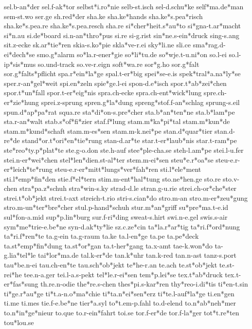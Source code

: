 sel.b-an*der
sel.f-ak*tor
selbst*i.ro*nie
selb-st.isch
sel-d.schu*ke
self*ma.de*man
sem-st.wo
ser.ge
sh.red*der
sha.ke
sha.ke*hands
sha.ke*s.pea*risch
sha.ke*s.pea.re
sha.ke*s.pea.resch
sha.re
si*cher*heit.s*au*to
si*gna-t.ar*macht
si*n.au
si.de*board
si.n-an*thro*pus
si.re
si-g.rist
sin*ne.s-ein*druck
sing-s.ang
sit.z-ecke
sk.ar*tie*ren
skia-s.ko*pie
skla*ve-r.ei
sky*li.ne
sli.ce
sma*rag.d-ei*dech*se
smo.g*alarm
so*la.r-ener*gie
so*li*tu.de
so*wje.t-u.ni*on
so.l-ei
so.l-ip*sis*mus
so.und-track
so.ve-r.eign
soft*wa.re
sor*g.ho
sor.g*falt
sor.g*falts*pflicht
spa.r*ein*la*ge
spal.t-er*big
spei*se-e.is
spek*tral*a.na*ly*se
sper.r-an*gel*weit
spi.en*zeln
spie*ge.l-ei
spon-d.e*isch
spor.t*ab*zei*chen
spor.t*un*fall
spor.t-er*eig*nis
spra.ch-ecke
spra.ch-ent*wick*lung
spre.ch-er*zie*hung
sprei.z-sprung
spren.g*la*dung
spreng*stof.f-an*schlag
sprung-s.eil
spun.d*ap*pa*rat
squa.re
sta*di*on-s.pre*cher
sta.b*an*ten*ne
sta.b*lam*pe
sta.r-an*walt
stab.s*of*fi*zier
staf.f*lung
stam.m*ka*pi*tal
stam.m*kun*de
stam.m*kund*schaft
stam.m-es*sen
stam.m-k.nei*pe
stan.d*quar*tier
stan.d-re*de
stand*or.t*ori*en*tie*rung
stan-d.ar*te
star.t-er*laub*nis
star.t-ram*pe
ste*reo*ty.p*plat*te
ste.g-o.don
ste.h-auf
stee*ple-cha.se
steh-l.am*pe
stei.l-u.fer
stei.n-er*wei*chen
stel*len*dien.st-al*ter
stem.m-ei*sen
steu*e.r*oa*se
steu-e.r-er*leich*te*rung
steu-e.r-er*mitt*lungs*ver*fah*ren
sti.l*ele*ment
sti.l*emp*fin*den
stie.f*el*tern
stim.m-ent*hal*tung
sto.ne*hen.ge
sto.re
sto.v-chen
stra*pa.z*schuh
stra*win-s.ky
strad-d.le
stran.g-u.rie
strei.ch-or*che*ster
strei.t*ob*jekt
strei.t-axt
streich-t.rio
stri-s.cian*do
stro.m-an
stro.m-er*zeu*gung
stro.m-un*ter*bre*cher
stul.p-hand*schuh
stur.m*an*griff
su*pre*ma.t-e.id
sul*fon-a.mid
sup*p.lin*burg
sur.f-ri*ding
sweat-s.hirt
swi.n-e.gel
swis.s-air
sym*me*trie-e.be*ne
syn-d.ak*ty*lie
sz.c.ze*cin
ta*la.r*ar*tig
ta*ri.f*ord*nung
ta*ri.f*ren*te
ta.g-ein
ta.g-raum
ta.ke
ta.l-en*ge
ta.pe
ta.pe*deck
ta.st*emp*fin*dung
ta.st*or*gan
ta.t-her*gang
ta.x-amt
tae-k.won*do
ta-g.lia*tel*le
tai*lor*ma.de
tal.k-er*de
tan.k*uhr
tan.k-red
tan.n-ast
tanz-s.port
tau*be.n-ei
tau.ch-en*te
tau.sch*ob*jekt
te*he-r.an
te.ach
te.st*ob*jekt
te.st-rei*he
tee.n-a.ger
tei.l-a.s-pekt
tel*le.r-ei*sen
tem*p.lei*se
tex.t*ab*druck
tex.t-er*fas*sung
th.re.n-odie
the*re.s-chen
thes*pi.s-kar*ren
thy*reo-i.di*tis
ti*en-t.sin
ti*ge.r*au*ge
ti*t.a-n.o*ma*chie
ti*ta.n*ei*sen*erz
ti*te.l-auf*la*ge
ti.en*gen
ti.me
ti.mes
tie.f-e.be*ne
tier*a.syl
to*t.em-p.fahl
to.d-elend
to.n*ab*neh*mer
to.n*in*ge*nieur
to.que
to.r-ein*fahrt
toi.se
tor.f-er*de
tor.f-la*ger
tot*t.re*ten
tou*lou.se
